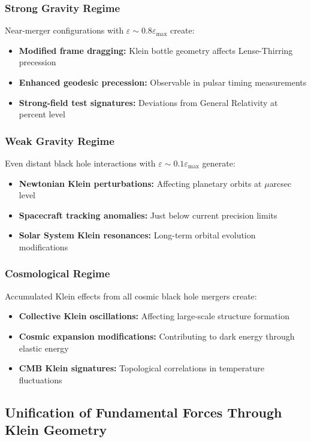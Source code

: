 \documentclass[12pt]{iopart}
\begin{document}
\subsubsection{Strong Gravity Regime}

Near-merger configurations with $\varepsilon \sim 0.8 \varepsilon_{\max}$ create:
\begin{itemize}
\item \textbf{Modified frame dragging:} Klein bottle geometry affects Lense-Thirring precession
\item \textbf{Enhanced geodesic precession:} Observable in pulsar timing measurements
\item \textbf{Strong-field test signatures:} Deviations from General Relativity at percent level
\end{itemize}

\subsubsection{Weak Gravity Regime}

Even distant black hole interactions with $\varepsilon \sim 0.1 \varepsilon_{\max}$ generate:
\begin{itemize}
\item \textbf{Newtonian Klein perturbations:} Affecting planetary orbits at $\mu$arcsec level
\item \textbf{Spacecraft tracking anomalies:} Just below current precision limits
\item \textbf{Solar System Klein resonances:} Long-term orbital evolution modifications
\end{itemize}

\subsubsection{Cosmological Regime}

Accumulated Klein effects from all cosmic black hole mergers create:
\begin{itemize}
\item \textbf{Collective Klein oscillations:} Affecting large-scale structure formation
\item \textbf{Cosmic expansion modifications:} Contributing to dark energy through elastic energy
\item \textbf{CMB Klein signatures:} Topological correlations in temperature fluctuations
\end{itemize}

\subsection{Unification of Fundamental Forces Through Klein Geometry}
\end{document}
